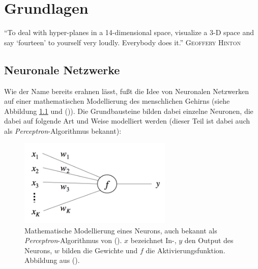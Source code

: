 
\chapter{Grundlagen} %

\label{Chapter3} %


\begin{itquote}
``To deal with hyper-planes in a 14-dimensional space, visualize a 3-D space and say `fourteen' to yourself
very loudly. Everybody does it.''
\flushright
\textsc{Geoffery Hinton}
\end{itquote}

\section{Neuronale Netzwerke}

Wie der Name bereits erahnen lässt, fußt die Idee von Neuronalen Netzwerken auf einer mathematischen Modellierung
des menschlichen Gehirns (siehe Abbildung \ref{fig:perceptron} und (\cite{rosenblatt1958perceptron})). Die Grundbausteine bilden dabei einzelne Neuronen, die dabei auf folgende Art und Weise
modelliert werden (dieser Teil ist dabei auch als \emph{Perceptron}-Algorithmus bekannt):

\begin{figure}[h]
  \centering
  \includegraphics[width=0.65\textwidth]{../img/neuron.png}
  \caption[Mathematische Modellierung eines Neurons]{Mathematische Modellierung eines Neurons, auch bekannt als
  \emph{Perceptron}-Algorithmus von (\cite{rosenblatt1958perceptron}). $x$ bezeichnet In-, $y$ den Output des Neurons, $w$ bilden die Gewichte und $f$ die
  Aktivierungsfunktion. Abbildung aus (\cite{rong2014word2vec}).\label{fig:perceptron}}
\end{figure}

